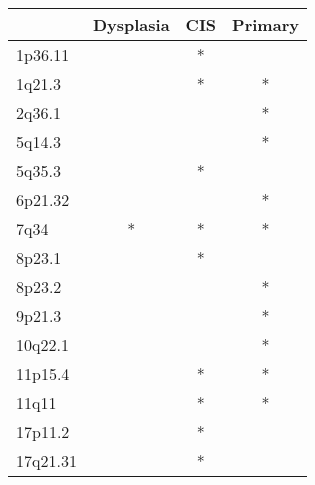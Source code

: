\begin{tabular}{lccc}
\toprule
{} & Dysplasia & CIS & Primary \\
\midrule
1p36.11  &           &   * &         \\
1q21.3   &           &   * &       * \\
2q36.1   &           &     &       * \\
5q14.3   &           &     &       * \\
5q35.3   &           &   * &         \\
6p21.32  &           &     &       * \\
7q34     &         * &   * &       * \\
8p23.1   &           &   * &         \\
8p23.2   &           &     &       * \\
9p21.3   &           &     &       * \\
10q22.1  &           &     &       * \\
11p15.4  &           &   * &       * \\
11q11    &           &   * &       * \\
17p11.2  &           &   * &         \\
17q21.31 &           &   * &         \\
\bottomrule
\end{tabular}
